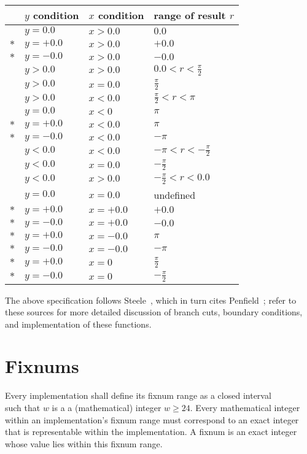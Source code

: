 \begin{center}
\begin{tabular}{clll}
& $y$ condition & $x$ condition & range of result $r$\\\hline
& $y = 0.0$ & $x > 0.0$ & $0.0$\\
$\ast$ & $y = +0.0$  & $x > 0.0$ & $+0.0$\\     
$\ast$ & $y = -0.0$ & $x > 0.0$ & $-0.0$\\
& $y > 0.0$ & $x > 0.0$ & $0.0 < r < \frac{\pi}{2}$\\
& $y > 0.0$ & $x = 0.0$ & $\frac{\pi}{2}$\\
& $y > 0.0$ & $x < 0.0$ & $\frac{\pi}{2} < r < \pi$\\
& $y = 0.0$ & $x < 0$ & $\pi$\\
$\ast$ & $y = +0.0$ & $x < 0.0$ & $\pi$\\
$\ast$ & $y = -0.0$ & $x < 0.0$ & $-\pi$\\      
&$y < 0.0$ & $x < 0.0$ & $-\pi< r< -\frac{\pi}{2}$\\
&$y < 0.0$ & $x = 0.0$ & $-\frac{\pi}{2}$\\
&$y < 0.0$ & $x > 0.0$ & $-\frac{\pi}{2} < r< 0.0$\\    
&$y = 0.0$ & $x = 0.0$ & undefined\\
$\ast$& $y = +0.0$ & $x = +0.0$ & $+0.0$\\
$\ast$& $y = -0.0$ & $x = +0.0$& $-0.0$\\
$\ast$& $y = +0.0$ & $x = -0.0$ & $\pi$\\
$\ast$& $y = -0.0$ & $x = -0.0$ & $-\pi$\\
$\ast$& $y = +0.0$ & $x = 0$ & $\frac{\pi}{2}$\\
$\ast$& $y = -0.0$ & $x = 0$    & $-\frac{\pi}{2}$
\end{tabular}
\end{center}

The above specification follows Steele~\cite{CLtL}, which in turn
cites Penfield~\cite{Penfield81}; refer to these sources for more detailed
discussion of branch cuts, boundary conditions, and implementation of
these functions.

\section{Fixnums}
\label{fixnumssection}

Every implementation shall define its fixnum range as a closed
interval
%
\begin{displaymath}
[-2^{w-1}, 2^{w-1} - 1]
\end{displaymath}
%
such that $w$ is a a (mathematical) integer $w \geq 24$.  Every
mathematical integer within an implementation's fixnum range must
correspond to an exact integer that is representable within the
implementation.
A fixnum is an exact integer whose value lies within this
fixnum range.

